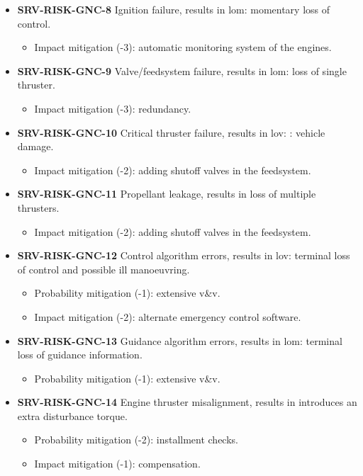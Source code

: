 \begin{itemize}
	 \item \textbf{SRV-RISK-GNC-8} Ignition failure, results in lom: momentary loss of control.
	\begin{itemize}
		 \item Impact mitigation (-3):  automatic monitoring system of the engines.	\end{itemize}
	 \item \textbf{SRV-RISK-GNC-9} Valve/feedsystem failure, results in lom: loss of single thruster.
	\begin{itemize}
		 \item Impact mitigation (-3):  redundancy.	\end{itemize}
	 \item \textbf{SRV-RISK-GNC-10} Critical thruster failure, results in lov: : vehicle damage.
	\begin{itemize}
		 \item Impact mitigation (-2):  adding shutoff valves in the feedsystem.	\end{itemize}
	 \item \textbf{SRV-RISK-GNC-11} Propellant leakage, results in loss of multiple thrusters.
	\begin{itemize}
		 \item Impact mitigation (-2):  adding shutoff valves in the feedsystem.	\end{itemize}
	 \item \textbf{SRV-RISK-GNC-12} Control algorithm errors, results in lov: terminal loss of control and possible ill manoeuvring.
	\begin{itemize}
		 \item Probability mitigation (-1):  extensive v\&v.		 \item Impact mitigation (-2):  alternate emergency control software.	\end{itemize}
	 \item \textbf{SRV-RISK-GNC-13} Guidance algorithm errors, results in lom: terminal loss of guidance information.
	\begin{itemize}
		 \item Probability mitigation (-1):  extensive v\&v.	\end{itemize}
	 \item \textbf{SRV-RISK-GNC-14} Engine thruster misalignment, results in introduces an extra disturbance torque.
	\begin{itemize}
		 \item Probability mitigation (-2):  installment checks.		 \item Impact mitigation (-1):  compensation.	\end{itemize}
\end{itemize}

